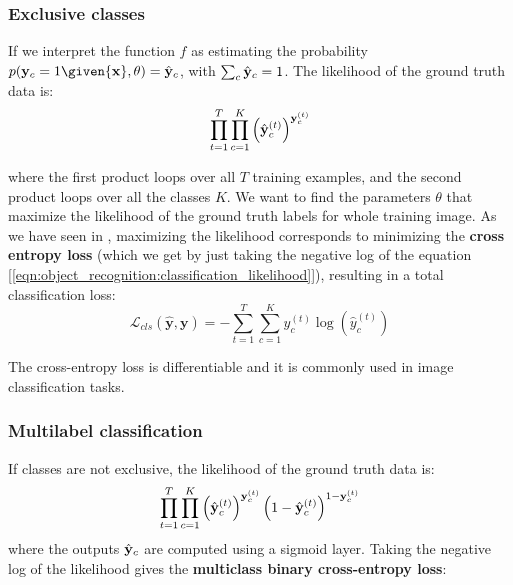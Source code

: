 \subsubsection{Exclusive classes}

If we interpret the function $f$ as estimating the probability $p({\bf y}_c=1 \given {\bf x}, \theta) = \hat {\bf y}_c$, with $\sum_c \hat {\bf y}_c =1$. The likelihood of the ground truth data is:
\begin{equation}
    \prod_{t=1}^T \prod_{c=1}^K \left( \hat {\bf y}^{(t)}_c \right) ^{{\bf y}^{(t)}_c}\label{eqn:object_recognition:classification_likelihood}
\end{equation}


where the first product loops over all $T$ training examples, and the second product loops over all the classes $K$. We want to find the parameters $\theta$ that maximize the likelihood of the ground truth labels for whole training image. As we have seen in \chap{\ref{chapter:convolutional_neural_nets}}, maximizing the likelihood corresponds to minimizing the {\bf cross entropy loss} (which we get by just taking the negative log of the  equation [\ref{eqn:object_recognition:classification_likelihood}]), resulting in a total classification loss:
\begin{equation}
    \mathcal{L}_{cls}(\hat{\mathbf{y}},\mathbf{y})
    = -\sum_{t=1}^{T} \sum_{c=1}^{K} y^{(t)}_c \log(\hat{y}^{(t)}_c)
\end{equation}

The cross-entropy loss is differentiable and it is commonly used in image classification tasks.

\subsubsection{Multilabel classification}

If classes are not exclusive, the likelihood of the ground truth data is:
\begin{equation}
    \prod_{t=1}^T \prod_{c=1}^K \left( \hat {\bf y}^{(t)}_c \right) ^{{\bf y}^{(t)}_c}
    \left( 1-\hat {\bf y}^{(t)}_c \right) ^{1-{\bf y}^{(t)}_c}
\end{equation}
where the outputs $\hat {\bf y}_c$ are computed using a sigmoid layer.  Taking the negative log of the likelihood gives the {\bf multiclass binary cross-entropy loss}:

